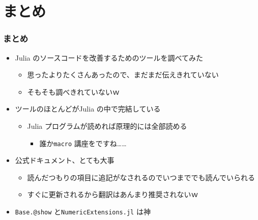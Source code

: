 \section{まとめ}

\begin{frame}[containsverbatim]
\frametitle{まとめ}
\begin{itemize}
  \item Julia のソースコードを改善するためのツールを調べてみた
    \begin{itemize}
      \item 思ったよりたくさんあったので、まだまだ伝えきれていない
      \item そもそも調べきれていないｗ
    \end{itemize}
  \item ツールのほとんどがJulia の中で完結している
    \begin{itemize}
      \item Julia プログラムが読めれば原理的には全部読める
        \begin{itemize}
          \item 誰か\verb|macro| 講座をですね……
        \end{itemize}
    \end{itemize}
  \item 公式ドキュメント、とても大事
    \begin{itemize}
      \item 読んだつもりの項目に追記がなされるのでいつまででも読んでいられる
      \item すぐに更新されるから翻訳はあんまり推奨されないｗ
    \end{itemize}
  \item \verb|Base.@show| と\verb|NumericExtensions.jl| は神
\end{itemize}
\end{frame}
